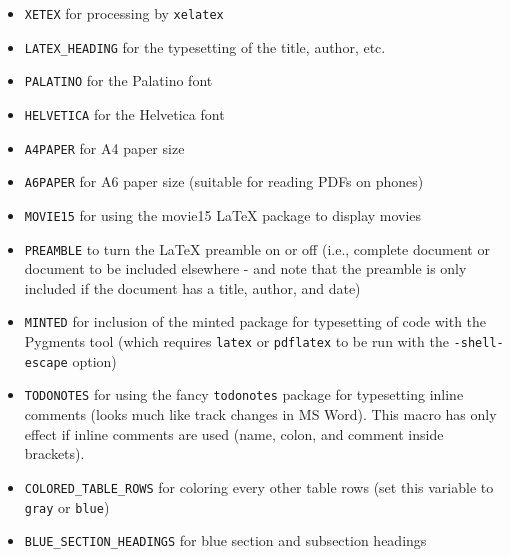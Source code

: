 \documentclass[%
oneside,                 %
final,                   %
10pt]{article}
\begin{document}
\begin{itemize}
 \item {\fontsize{10pt}{10pt}\Verb!XETEX!} for processing by {\fontsize{10pt}{10pt}\Verb!xelatex!}

 \item {\fontsize{10pt}{10pt}\Verb!LATEX_HEADING!} for the typesetting of the title, author, etc.

 \item {\fontsize{10pt}{10pt}\Verb!PALATINO!} for the Palatino font

 \item {\fontsize{10pt}{10pt}\Verb!HELVETICA!} for the Helvetica font

 \item {\fontsize{10pt}{10pt}\Verb!A4PAPER!} for A4 paper size

 \item {\fontsize{10pt}{10pt}\Verb!A6PAPER!} for A6 paper size (suitable for reading PDFs on phones)

 \item {\fontsize{10pt}{10pt}\Verb!MOVIE15!} for using the movie15 {\LaTeX} package to display movies

 \item {\fontsize{10pt}{10pt}\Verb!PREAMBLE!} to turn the {\LaTeX} preamble on or off (i.e., complete document
   or document to be included elsewhere - and note that
   the preamble is only included
   if the document has a title, author, and date)

 \item {\fontsize{10pt}{10pt}\Verb!MINTED!} for inclusion of the minted package for typesetting of
   code with the Pygments tool (which requires {\fontsize{10pt}{10pt}\Verb!latex!}
   or {\fontsize{10pt}{10pt}\Verb!pdflatex!} to be run with the {\fontsize{10pt}{10pt}\Verb!-shell-escape!} option)

 \item {\fontsize{10pt}{10pt}\Verb!TODONOTES!} for using the fancy {\fontsize{10pt}{10pt}\Verb!todonotes!} package for typesetting
   inline comments (looks much like track changes in MS Word). This
   macro has only effect if inline comments are used (name, colon,
   and comment inside brackets).

 \item {\fontsize{10pt}{10pt}\Verb!COLORED_TABLE_ROWS!} for coloring every other table rows (set this
   variable to {\fontsize{10pt}{10pt}\Verb!gray!} or {\fontsize{10pt}{10pt}\Verb!blue!})

 \item {\fontsize{10pt}{10pt}\Verb!BLUE_SECTION_HEADINGS!} for blue section and subsection headings
\end{itemize}
\end{document}
